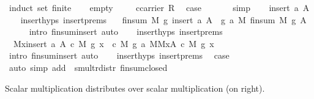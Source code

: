 \begin{isabellebody}
%
\isadelimproof
%
\endisadelimproof
%
\isatagproof
{}\isamarkupfalse%
\ {\isacharparenleft}induct\ set{\isacharcolon}\ finite{\isacharparenright}\isanewline
\ \ \isamarkupfalse%
\ empty\ \isanewline
\ \ \isamarkupfalse%
\ {\isacharbackquoteopen}c{\isasymin}carrier\ R{\isacharbackquoteclose}\ \isamarkupfalse%
\ {\isacharquery}case\ \isanewline
\ \ \ \ \isamarkupfalse%
\ simp\isanewline
{}\isamarkupfalse%
\isanewline
\ \ \isamarkupfalse%
\ {\isacharparenleft}insert\ a\ A{\isacharparenright}\isanewline
\ \ \isamarkupfalse%
\ insert{\isachardot}hyps\ insert{\isachardot}prems\ \isamarkupfalse%
\ {}{\isacharcolon}\ {\isachardoublequoteopen}finsum\ M\ g\ {\isacharparenleft}insert\ a\ A{\isacharparenright}\ {\isacharequal}\ g\ a\ {\isasymoplus}\isactrlbsub M\isactrlesub \ finsum\ M\ g\ A{\isachardoublequoteclose}\isanewline
\ \ \ \ \isamarkupfalse%
\ {\isacharparenleft}intro\ finsum{\isacharunderscore}insert{\isacharcomma}\ auto{\isacharparenright}\isanewline
\ \ \isamarkupfalse%
\ insert{\isachardot}hyps\ insert{\isachardot}prems\ \isamarkupfalse%
\ {}{\isacharcolon}\ {\isachardoublequoteopen}{\isacharparenleft}{\isasymOplus}\isactrlbsub M\isactrlesub x{\isasymin}insert\ a\ A{\isachardot}\ c\ {\isasymodot}\isactrlbsub M\isactrlesub \ g\ x{\isacharparenright}\ {\isacharequal}\ c\ {\isasymodot}\isactrlbsub M\isactrlesub \ g\ a\ {\isasymoplus}\isactrlbsub M\isactrlesub {\isacharparenleft}{\isasymOplus}\isactrlbsub M\isactrlesub x{\isasymin}A{\isachardot}\ c\ {\isasymodot}\isactrlbsub M\isactrlesub \ g\ x{\isacharparenright}{\isachardoublequoteclose}\ \isanewline
\ \ \ \ \isamarkupfalse%
\ {\isacharparenleft}intro\ finsum{\isacharunderscore}insert{\isacharcomma}\ auto{\isacharparenright}\isanewline
\ \ \isamarkupfalse%
\ insert{\isachardot}hyps\ insert{\isachardot}prems\ \isamarkupfalse%
\ {\isacharquery}case\ \isanewline
\ \ \ \ \isamarkupfalse%
\ {\isacharparenleft}auto\ simp\ add{\isacharcolon}{}\ {}\ smult{\isacharunderscore}r{\isacharunderscore}distr\ finsum{\isacharunderscore}closed{\isacharparenright}\isanewline
{}\isamarkupfalse%
%
\endisatagproof
{\isafoldproof}%
%
\isadelimproof
%
\endisadelimproof
%
\begin{isamarkuptext}%
Scalar multiplication distributes over scalar multiplication (on right).%
\end{isamarkuptext}%

\end{isabellebody}
